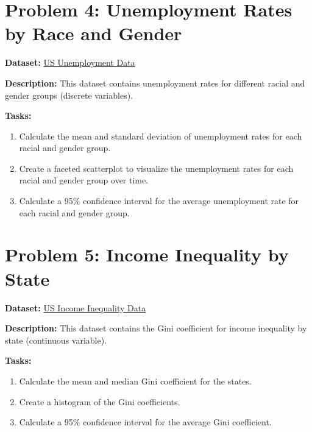 \documentclass[
  letterpaper,
  DIV=11,
  numbers=noendperiod]{scrreprt}
\providecommand{\tightlist}{%
  \setlength{\itemsep}{0pt}\setlength{\parskip}{0pt}}\usepackage{longtable,booktabs,array}
\begin{document}
\section*{Problem 4: Unemployment Rates by Race and
Gender}\label{problem-4-unemployment-rates-by-race-and-gender}


\textbf{Dataset:} \href{https://www.bls.gov/cps/}{US Unemployment Data}

\textbf{Description:} This dataset contains unemployment rates for
different racial and gender groups (discrete variables).

\textbf{Tasks:}

\begin{enumerate}
\def\labelenumi{\arabic{enumi}.}
\tightlist
\item
  Calculate the mean and standard deviation of unemployment rates for
  each racial and gender group.
\item
  Create a faceted scatterplot to visualize the unemployment rates for
  each racial and gender group over time.
\item
  Calculate a 95\% confidence interval for the average unemployment rate
  for each racial and gender group.
\end{enumerate}

\section*{Problem 5: Income Inequality by
State}\label{problem-5-income-inequality-by-state}


\textbf{Dataset:} \href{https://www.census.gov/data.html}{US Income
Inequality Data}

\textbf{Description:} This dataset contains the Gini coefficient for
income inequality by state (continuous variable).

\textbf{Tasks:}

\begin{enumerate}
\def\labelenumi{\arabic{enumi}.}
\tightlist
\item
  Calculate the mean and median Gini coefficient for the states.
\item
  Create a histogram of the Gini coefficients.
\item
  Calculate a 95\% confidence interval for the average Gini coefficient.
\end{enumerate}
\end{document}
